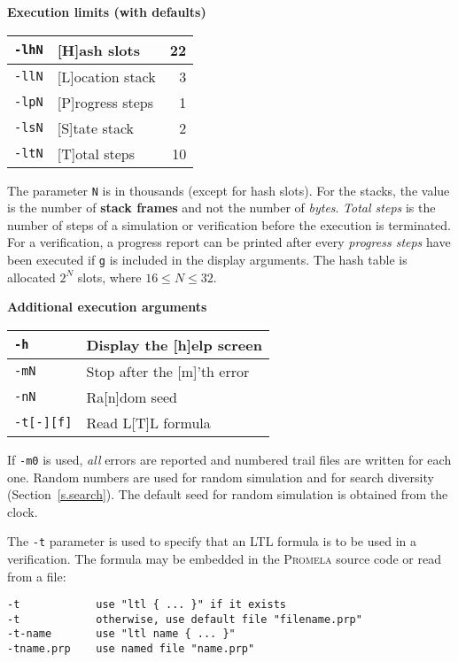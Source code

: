 \documentclass[11pt]{article}
\newcommand*{\prm}{\textsc{Promela}}
\newcommand*{\p}[1]{\texttt{#1}}
\begin{document}
\pagebreak[3]

\textbf{Execution limits (with defaults)}
\begin{center}
\begin{tabular}{|l|p{}|r|}
\hline
\p{-lhN} & [H]ash slots & 22\\\hline
\p{-llN} & [L]ocation stack & 3\\\hline
\p{-lpN} & [P]rogress steps & 1\\\hline
\p{-lsN} & [S]tate stack & 2\\\hline
\p{-ltN} & [T]otal steps & 10\\\hline
\end{tabular}
\end{center}

\medskip

The parameter \p{N} is in thousands (except for hash slots). For the
stacks, the value is the number of \textbf{stack frames} and not the
number of \emph{bytes}. \emph{Total steps} is the number of steps of a
simulation or verification before the execution is terminated. For a
verification, a progress report can be printed after every
\emph{progress steps} have been executed if \p{g} is included in the
display arguments. The hash table is allocated $2^{N}$ slots, where $16
\leq N \leq 32$.

\medskip

\textbf{Additional execution arguments}
\begin{center}
\begin{tabular}{|l|p{}|}
\hline
\p{-h} & Display the [h]elp screen\\\hline
\p{-mN} & Stop after the [m]'th error\\\hline
\p{-nN} & Ra[n]dom seed\\\hline
\p{-t[-][f]} & Read L[T]L formula\\\hline
\end{tabular}
\end{center}

If \p{-m0} is used, \emph{all} errors are reported and numbered trail
files are written for each one. Random numbers are used for random
simulation and for search diversity (Section~\ref{s.search}). The
default seed for random simulation is obtained from the clock.

The \p{-t} parameter is used to specify that an LTL formula is to be
used in a verification. The formula may be embedded in the \prm{} source
code or read from a file:
\begin{verbatim}
-t            use "ltl { ... }" if it exists
-t            otherwise, use default file "filename.prp"
-t-name       use "ltl name { ... }"
-tname.prp    use named file "name.prp"
\end{verbatim}
\end{document}
